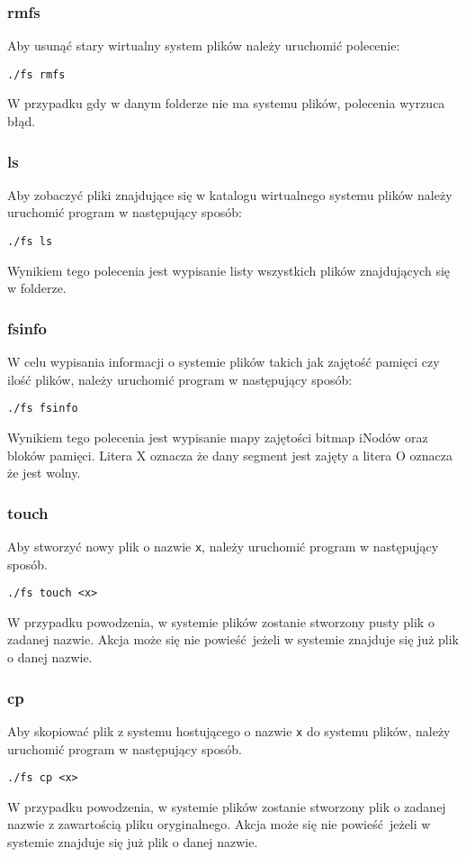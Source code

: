 \documentclass{mwrep}
\begin{document}
\subsubsection{rmfs}
Aby usunąć stary wirtualny system plików należy uruchomić polecenie:
\begin{center}
    \texttt{./fs rmfs}
\end{center}
W przypadku gdy w danym folderze nie ma systemu plików, polecenia wyrzuca błąd.

\subsubsection{ls}
Aby zobaczyć pliki znajdujące się w katalogu wirtualnego systemu plików należy uruchomić program
w następujący sposób:
\begin{center}
    \texttt{./fs ls}
\end{center}
Wynikiem tego polecenia jest wypisanie listy wszystkich plików znajdujących się w folderze.

\subsubsection{fsinfo}
W celu wypisania informacji o systemie plików takich jak zajętość pamięci czy ilość plików, należy
uruchomić program w następujący sposób:
\begin{center}
    \texttt{./fs fsinfo}
\end{center}
Wynikiem tego polecenia jest wypisanie mapy zajętości bitmap iNodów oraz bloków pamięci. Litera X 
oznacza że dany segment jest zajęty a litera O oznacza że jest wolny.

\subsubsection{touch}
Aby stworzyć nowy plik o nazwie \texttt{x}, należy uruchomić program w następujący sposób.
\begin{center}
    \texttt{./fs touch <x>}
\end{center}
W przypadku powodzenia, w systemie plików zostanie stworzony pusty plik o zadanej nazwie.
Akcja może się nie powieść jeżeli w systemie znajduje się już plik o danej nazwie.

\subsubsection{cp}
Aby skopiować plik z systemu hostującego o nazwie \texttt{x} do systemu plików, należy uruchomić program w następujący sposób.
\begin{center}
    \texttt{./fs cp <x>}
\end{center}
W przypadku powodzenia, w systemie plików zostanie stworzony plik o zadanej nazwie z zawartością pliku oryginalnego.
Akcja może się nie powieść jeżeli w systemie znajduje się już plik o danej nazwie.
\end{document}
